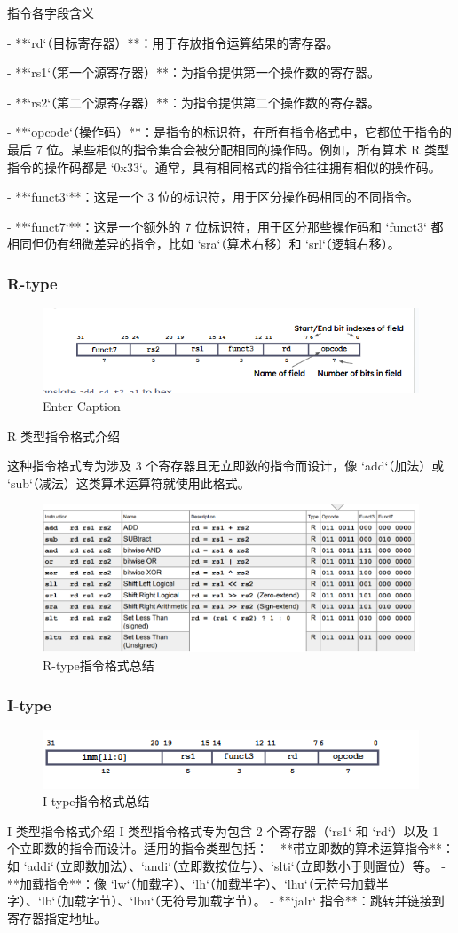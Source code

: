 \documentclass{ctexart}
\begin{document}
 指令各字段含义\par
- **`rd`（目标寄存器）**：用于存放指令运算结果的寄存器。\par
- **`rs1`（第一个源寄存器）**：为指令提供第一个操作数的寄存器。\par
- **`rs2`（第二个源寄存器）**：为指令提供第二个操作数的寄存器。\par
- **`opcode`（操作码）**：是指令的标识符，在所有指令格式中，它都位于指令的最后 7 位。某些相似的指令集合会被分配相同的操作码。例如，所有算术 R 类型指令的操作码都是 `0x33`。通常，具有相同格式的指令往往拥有相似的操作码。\par
- **`funct3`**：这是一个 3 位的标识符，用于区分操作码相同的不同指令。\par
- **`funct7`**：这是一个额外的 7 位标识符，用于区分那些操作码和 `funct3` 都相同但仍有细微差异的指令，比如 `sra`（算术右移）和 `srl`（逻辑右移）。 \par
\subsubsection{R-type}
\begin{figure}
    \centering
    \includegraphics[width=0.5\linewidth]{Rtype.png}
    \caption{Enter Caption}
    \label{fig:enter-label}
\end{figure}
 R 类型指令格式介绍\par
这种指令格式专为涉及 3 个寄存器且无立即数的指令而设计，像 `add`（加法）或 `sub`（减法）这类算术运算符就使用此格式。\par
\begin{figure}
    \centering
    \includegraphics[width=0.5\linewidth]{R-type指令格式总结.png}
    \caption{R-type指令格式总结}
    \label{fig:enter-label}
\end{figure}
\subsubsection{I-type}
\begin{figure}
    \centering
    \includegraphics[width=0.5\linewidth]{I-type指令格式总结.png}
    \caption{I-type指令格式总结}
    \label{fig:enter-label}
\end{figure}
 I 类型指令格式介绍
I 类型指令格式专为包含 2 个寄存器（`rs1` 和 `rd`）以及 1 个立即数的指令而设计。适用的指令类型包括：
- **带立即数的算术运算指令**：如 `addi`（立即数加法）、`andi`（立即数按位与）、`slti`（立即数小于则置位）等。
- **加载指令**：像 `lw`（加载字）、`lh`（加载半字）、`lhu`（无符号加载半字）、`lb`（加载字节）、`lbu`（无符号加载字节）。
- **`jalr` 指令**：跳转并链接到寄存器指定地址。
\end{document}
